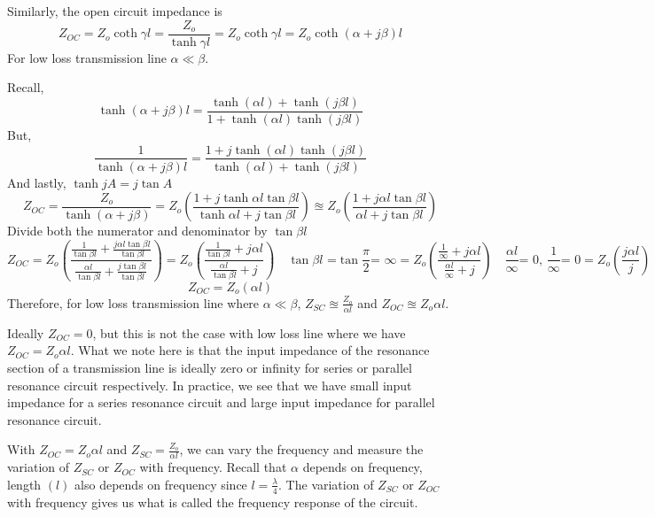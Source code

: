 Similarly, the open circuit impedance is 
\begin{dmath*}
Z_{OC}=Z_{o}\coth\gamma l=\frac{Z_{o}}{\tanh\gamma l}
=Z_{o}\coth\gamma l=Z_{o}\coth(\alpha+j\beta) l
\end{dmath*}
For low loss transmission line $ \alpha\ll\beta $.

Recall, 
\[ \tanh(\alpha+j\beta)l=\frac{\tanh (\alpha l) + \tanh (j\beta l)}{1 + \tanh (\alpha l)\tanh (j\beta l)} \]
But,
\[ \frac{1}{\tanh(\alpha+j\beta)l}=\frac{1 + j\tanh (\alpha l)\tanh (j\beta l)}{\tanh (\alpha l) + \tanh (j\beta l)} \]
And lastly, $ \tanh jA= j \tan A $
\begin{dmath*}
Z_{OC} = \frac{Z_{o}}{\tanh(\alpha+j\beta)}
=Z_{o}\left(\frac{1+j\tanh \alpha l\tan \beta l}{\tanh \alpha l+j\tan \beta l}\right)
\approxeq Z_{o}\left(\frac{1+ j \alpha l\tan \beta l}{\alpha l+j\tan \beta l}\right)
\end{dmath*}
Divide both the numerator and denominator by $ \tan \beta l $
\begin{dmath*}
Z_{OC}=Z_{o}\left(\frac{\frac{1}{\tan \beta l}+\frac{j \alpha l\tan \beta l}{\tan \beta l}}{\frac{\alpha l}{\tan \beta l}+\frac{j\tan \beta l}{\tan \beta l}}\right)
=Z_{o}\left(\frac{\frac{1}{\tan \beta l} + j \alpha l}{\frac{\alpha l}{\tan \beta l} + j}\right)\quad\tan\beta l\text{ =}\tan\frac{\pi}{2}\text{= }\infty
=Z_{o}\left(\frac{\frac{1}{\infty} + j \alpha l}{\frac{\alpha l}{\infty} + j}\right)\quad\frac{\alpha l}{\infty}\text{= 0, }\frac{1}{\infty}\text{= 0}
=Z_{o}\left(\frac{j \alpha l}{j}\right)
\end{dmath*}
\begin{equation}
Z_{OC}=Z_{o}(\alpha l)
\end{equation}
Therefore, for low loss transmission line where $\alpha\ll\beta$, $ Z_{SC}\approxeq \frac{Z_{o}}{\alpha l} $ and $ Z_{OC} \approxeq Z_{o} \alpha l $. 

Ideally $ Z_{OC}=0 $, but this is not the case with low loss line where we have $ Z_{OC} = Z_{o} \alpha l $. What we note here is that the input impedance of the resonance section of a transmission line is ideally zero or infinity for series or parallel resonance circuit respectively. In practice, we see that we have small input impedance for a series resonance circuit and large input impedance for parallel resonance circuit.

With $ Z_{OC} = Z_{o} \alpha l $ and 
$ Z_{SC}= \frac{Z_{o}}{\alpha l} $, we can vary the frequency and measure the variation of $ Z_{SC} $ or $ Z_{OC} $ with frequency. Recall that $ \alpha $ depends on frequency, length $(l)$ also depends on frequency since $ l=\frac{\lambda}{4} $. The variation of $ Z_{SC} $ or $ Z_{OC} $ with frequency gives us what is called the frequency response of the circuit.

